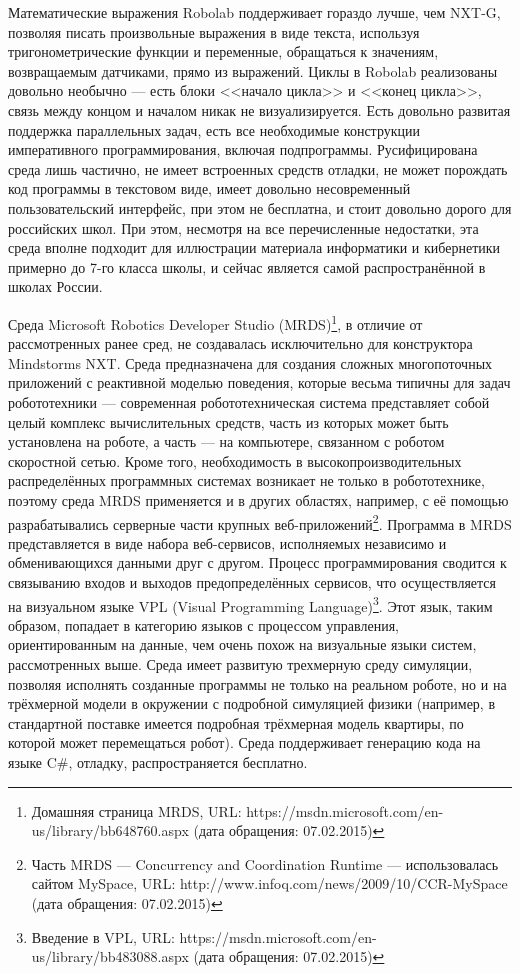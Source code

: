 Математические выражения Robolab поддерживает гораздо лучше, чем NXT-G, позволяя писать 
произвольные выражения в виде текста, используя тригонометрические функции и переменные, 
обращаться к значениям, возвращаемым датчиками, прямо из выражений. Циклы в Robolab 
реализованы довольно необычно --- есть блоки <<начало цикла>> и <<конец цикла>>, связь 
между концом и началом никак не визуализируется. Есть довольно развитая поддержка 
параллельных задач, есть все необходимые конструкции императивного программирования, 
включая подпрограммы. Русифицирована среда лишь частично, не имеет встроенных средств 
отладки, не может порождать код программы в текстовом виде, имеет довольно несовременный 
пользовательский интерфейс, при этом не бесплатна, и стоит довольно дорого для российских 
школ. При этом, несмотря на все перечисленные недостатки, эта среда вполне подходит 
для иллюстрации материала информатики и кибернетики примерно до 7-го класса школы,
и сейчас является самой распространённой в школах России.

Среда Microsoft Robotics Developer Studio 
(MRDS)\footnote{Домашняя страница MRDS, URL: https://msdn.microsoft.com/en-us/library/bb648760.aspx (дата обращения: 07.02.2015)}, 
в отличие от рассмотренных ранее сред, не создавалась исключительно для конструктора 
Mindstorms NXT. Среда предназначена для создания сложных многопоточных приложений с 
реактивной моделью поведения, которые весьма типичны для задач робототехники --- современная 
робототехническая система представляет собой целый комплекс вычислительных средств, 
часть из которых может быть установлена на роботе, а часть --- на компьютере, связанном 
с роботом скоростной сетью. Кроме того, необходимость в высокопроизводительных распределённых 
программных системах возникает не только в робототехнике, поэтому среда MRDS применяется 
и в других областях, например, с её помощью разрабатывались серверные части крупных 
веб-приложений\footnote{Часть MRDS --- Concurrency and Coordination Runtime --- использовалась сайтом MySpace,
URL: http://www.infoq.com/news/2009/10/CCR-MySpace (дата обращения: 07.02.2015)}. 
Программа в MRDS представляется в виде набора веб-сервисов, исполняемых независимо 
и обменивающихся данными друг с другом. Процесс программирования сводится к связыванию 
входов и выходов предопределённых сервисов, что осуществляется на визуальном языке 
VPL (Visual Programming Language)\footnote{Введение в VPL, URL: https://msdn.microsoft.com/en-us/library/bb483088.aspx (дата обращения: 07.02.2015)}. 
Этот язык, таким образом, попадает в категорию языков с процессом управления, ориентированным 
на данные, чем очень похож на визуальные языки систем, рассмотренных выше. Среда имеет 
развитую трехмерную среду симуляции, позволяя исполнять созданные программы не только 
на реальном роботе, но и на трёхмерной модели в окружении с подробной симуляцией физики 
(например, в стандартной поставке имеется подробная трёхмерная модель квартиры, по которой 
может перемещаться робот). Среда поддерживает генерацию кода на языке C\#, отладку, 
распространяется бесплатно.

